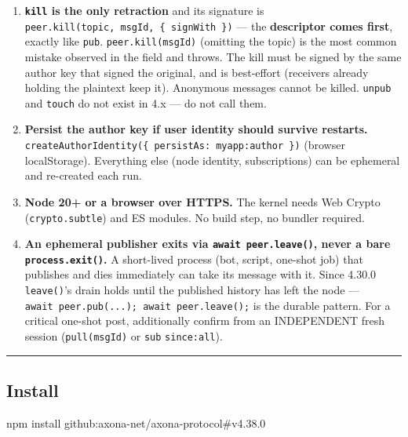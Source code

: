 \documentclass[
  nobib]{tufte-handout}
\newenvironment{Shaded}{}{}
\newcommand{\ExtensionTok}[1]{#1}
\newcommand{\NormalTok}[1]{#1}
\begin{document}
\begin{enumerate}
  ceiling). Re-publishing the identical payload from the same author
  yields the SAME msgId and refreshes the hold (an upsert; subscribers
  are not re-notified). Axona is a live messaging fabric, not permanent
  storage.
\item
  \textbf{\texttt{kill} is the only retraction} and its signature is
  \texttt{peer.kill(topic,\ msgId,\ \{\ signWith\ \})} --- the
  \textbf{descriptor comes first}, exactly like \texttt{pub}.
  \texttt{peer.kill(msgId)} (omitting the topic) is the most common
  mistake observed in the field and throws. The kill must be signed by
  the same author key that signed the original, and is best-effort
  (receivers already holding the plaintext keep it). Anonymous messages
  cannot be killed. \texttt{unpub} and \texttt{touch} do not exist in
  4.x --- do not call them.
\item
  \textbf{Persist the author key if user identity should survive
  restarts.}
  \texttt{createAuthorIdentity(\{\ persistAs:\ \textquotesingle{}myapp:author\textquotesingle{}\ \})}
  (browser localStorage). Everything else (node identity, subscriptions)
  can be ephemeral and re-created each run.
\item
  \textbf{Node 20+ or a browser over HTTPS.} The kernel needs Web Crypto
  (\texttt{crypto.subtle}) and ES modules. No build step, no bundler
  required.
\item
  \textbf{An ephemeral publisher exits via \texttt{await\ peer.leave()},
  never a bare \texttt{process.exit()}.} A short-lived process (bot,
  script, one-shot job) that publishes and dies immediately can take its
  message with it. Since 4.30.0 \texttt{leave()}'s drain holds until the
  published history has left the node ---
  \texttt{await\ peer.pub(...);\ await\ peer.leave();} is the durable
  pattern. For a critical one-shot post, additionally confirm from an
  INDEPENDENT fresh session (\texttt{pull(msgId)} or \texttt{sub}
  \texttt{since:\textquotesingle{}all\textquotesingle{}}).
\end{enumerate}

\begin{center}\rule{0.5\linewidth}{0.5pt}\end{center}

\subsection{Install}\label{install}

\begin{Shaded}
\begin{Highlighting}[]
\ExtensionTok{npm}\NormalTok{ install github:axona{-}net/axona{-}protocol\#v4.38.0}
\end{Highlighting}
\end{Shaded}
\end{document}
